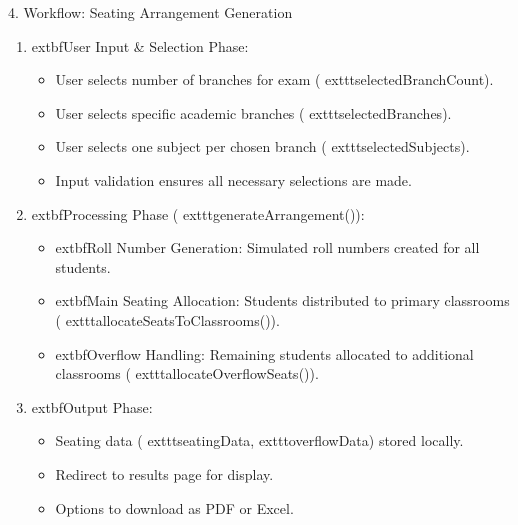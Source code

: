 \documentclass{beamer}
\begin{document}
\begin{frame}{4. Workflow: Seating Arrangement Generation}
    \begin{enumerate}
        \item 	extbf{User Input \& Selection Phase:}
            \begin{itemize}
                \item User selects number of branches for exam (	exttt{selectedBranchCount}).
                \item User selects specific academic branches (	exttt{selectedBranches}).
                \item User selects one subject per chosen branch (	exttt{selectedSubjects}).
                \item Input validation ensures all necessary selections are made.
            \end{itemize}
        \item 	extbf{Processing Phase (	exttt{generateArrangement()}):}
            \begin{itemize}
                \item 	extbf{Roll Number Generation:} Simulated roll numbers created for all students.
                \item 	extbf{Main Seating Allocation:} Students distributed to primary classrooms (	exttt{allocateSeatsToClassrooms()}).
                \item 	extbf{Overflow Handling:} Remaining students allocated to additional classrooms (	exttt{allocateOverflowSeats()}).
            \end{itemize}
        \item 	extbf{Output Phase:}
            \begin{itemize}
                \item Seating data (	exttt{seatingData}, 	exttt{overflowData}) stored locally.
                \item Redirect to results page for display.
                \item Options to download as PDF or Excel.
            \end{itemize}
    \end{enumerate}
\end{frame}
\end{document}
